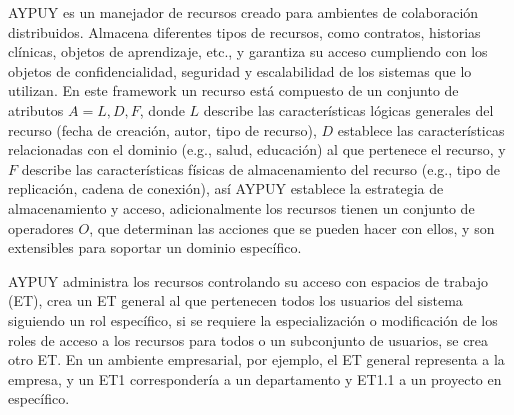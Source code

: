 AYPUY es un manejador de recursos creado para ambientes de colaboraci\'on distribuidos.  Almacena diferentes tipos de recursos, como contratos, historias cl\'inicas, objetos de aprendizaje, etc., y garantiza su acceso cumpliendo con los objetos de confidencialidad, seguridad y escalabilidad de los sistemas que lo utilizan. En este framework un recurso est\'a compuesto de un conjunto de atributos $A = { L, D, F }$, donde $L$ describe las caracter\'isticas l\'ogicas generales del recurso (fecha de creaci\'on, autor, tipo de recurso), $D$ establece las caracter\'isticas relacionadas con el dominio (e.g., salud, educaci\'on) al que pertenece el recurso, y $F$ describe las caracter\'isticas f\'isicas de almacenamiento del recurso (e.g., tipo de replicaci\'on, cadena de conexi\'on), as\'i AYPUY establece la estrategia de almacenamiento y acceso, adicionalmente los recursos tienen un conjunto de operadores $O$, que determinan las acciones que se pueden hacer con ellos, y son extensibles para soportar un dominio espec\'ifico.

AYPUY administra los recursos controlando su acceso con espacios de trabajo (ET), crea un ET general al que pertenecen todos los usuarios del sistema siguiendo un rol espec\'ifico, si se requiere la especializaci\'on o modificaci\'on de los roles de acceso a los recursos para todos o un subconjunto de usuarios, se crea otro ET. En un ambiente empresarial, por ejemplo, el ET general representa a la empresa, y un ET1 corresponder\'ia a un departamento y ET1.1 a un proyecto en espec\'ifico.

